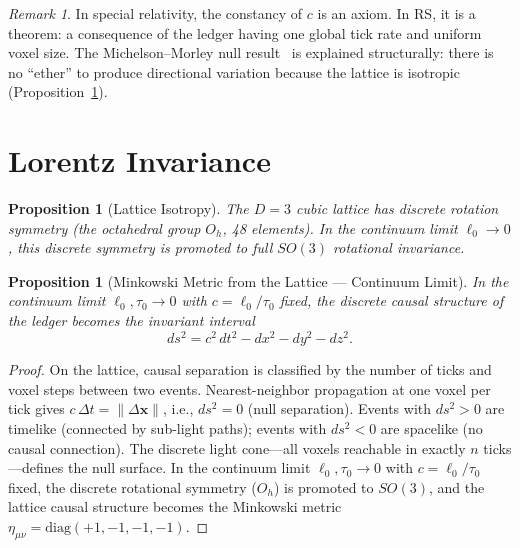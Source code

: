 \documentclass[12pt,a4paper]{article}
\newtheorem{proposition}[theorem]{Proposition}
\theoremstyle{definition}
\theoremstyle{remark}
\newtheorem{remark}[theorem]{Remark}
\begin{document}
\begin{remark}
In special relativity, the constancy of $c$ is an axiom.  In RS,
it is a theorem: a consequence of the ledger having one global
tick rate and uniform voxel size.  The Michelson--Morley null
result~\cite{MichelsonMorley1887} is explained structurally:
there is no ``ether'' to produce directional variation because
the lattice is isotropic (Proposition~\ref{prop:isotropy}).
\end{remark}

\section{Lorentz Invariance}
\label{sec:lorentz}

\begin{proposition}[Lattice Isotropy]
\label{prop:isotropy}
The $D = 3$ cubic lattice has discrete rotation symmetry
(the octahedral group $O_h$, 48 elements).  In the continuum
limit $\ell_0 \to 0$, this discrete symmetry is promoted to
full $SO(3)$ rotational invariance.
\end{proposition}

\begin{proposition}[Minkowski Metric from the Lattice --- Continuum Limit]
\label{thm:minkowski}
In the continuum limit $\ell_0, \tau_0 \to 0$ with $c = \ell_0/\tau_0$
fixed, the discrete causal structure of the ledger becomes the
invariant interval
\begin{equation}
  ds^2 = c^2\,dt^2 - dx^2 - dy^2 - dz^2.
\end{equation}
\end{proposition}

\begin{proof}
On the lattice, causal separation is classified by the number
of ticks and voxel steps between two events.
Nearest-neighbor propagation at one voxel per tick gives
$c\,\Delta t = \|\Delta\mathbf{x}\|$, i.e.,
$ds^2 = 0$ (null separation).  Events with $ds^2 > 0$ are
timelike (connected by sub-light paths); events with
$ds^2 < 0$ are spacelike (no causal connection).  The discrete
light cone---all voxels reachable in exactly $n$ ticks---defines
the null surface.  In the continuum limit
$\ell_0, \tau_0 \to 0$ with $c = \ell_0/\tau_0$ fixed, the
discrete rotational symmetry ($O_h$) is promoted to $SO(3)$,
and the lattice causal structure becomes the Minkowski metric
$\eta_{\mu\nu} = \mathrm{diag}(+1,-1,-1,-1)$.
\end{proof}
\end{document}
